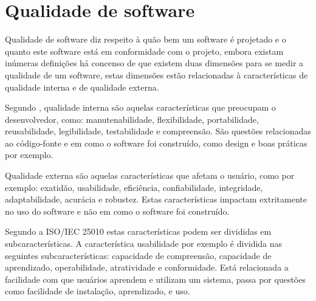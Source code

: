 \documentclass[qual, classic, a4paper]{ufbathesis}
\begin{document}
\section{Qualidade de software}

Qualidade de software diz respeito à quão bem um software é projetado e o
quanto este software está em conformidade com o projeto, embora existam
inúmeras definições há concenso de que existem duas dimensões para se medir a
qualidade de um software, estas dimensões estão relacionadas à características
de qualidade interna e de qualidade externa.


Segundo , qualidade interna são aquelas
características que preocupam o desenvolvedor, como: manutenabilidade,
flexibilidade, portabilidade, reusabilidade, legibilidade, testabilidade e
compreensão. São questões relacionadas ao código-fonte e em como o software
foi construído, como design e boas práticas por exemplo.

Qualidade externa são aquelas características que afetam o usuário, como por
exemplo: exatidão, usabilidade, eficiência, confiabilidade, integridade,
adaptabilidade, acurácia e robustez. Estas características impactam
extritamente no uso do software e não em como o software foi construído.

Segundo a ISO/IEC 25010 \cite{iso2011iec25010} estas características podem
ser divididas em subcaracterísticas. A característica usabilidade por exemplo
é dividida nas seguintes subcaracterísticas: capacidade de compreensão,
capacidade de aprendizado, operabilidade, atratividade e conformidade. Está
relacionada a facilidade com que usuários aprendem e utilizam um sistema,
passa por questões como facilidade de instalação, aprendizado, e uso.

%
\end{document}
